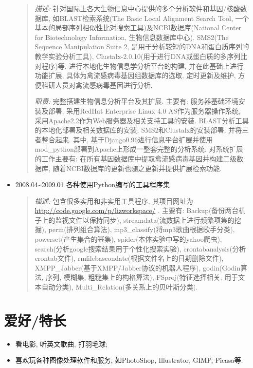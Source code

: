 \documentclass[a4paper,10pt,english]{manual}
\begin{document}
\begin{itemize}
\begin{quote}
\emph{描述:} 针对国际上各大生物信息中心提供的多个分析软件和基因/核酸数据库, 如BLAST检索系统(The Basic Local Alignment Search Tool, 一个基本的局部序列相似性比对搜索工具)及NCBI数据库(National Center for Biotechnology Information, 生物信息数据库中心), SMS2(The Sequence Manipulation Suite 2, 是用于分析较短的DNA和蛋白质序列的教学实验分析工具), Clustalx-2.0.10(用于进行DNA或蛋白质的多序列比对程序)等, 进行本地化生物信息学分析平台的构建, 并在此基础上进行功能扩展, 具体为禽流感病毒基因组数据库的选取, 定时更新及维护, 方便科研人员对禽流感病毒基因进行分析.


\emph{职责:} 完整搭建生物信息分析平台及其扩展. 主要有: 服务器基础环境安装及部署, 采用RedHat Enterprise Linux 4.0 AS作为服务器操作系统, 采用Apache2.2作为Web服务器及相关支持工具的安装. BLAST分析工具的本地化部署及相关数据库的安装, SMS2和Clustalx的安装部署, 并将三者整合起来. 其中, 基于Django0.96进行信息平台扩展并使用mod\_python部署到Apache上形成一整套完整的分析系统. 对系统扩展的工作主要有: 在所有基因数据库中提取禽流感病毒基因并构建二级数据库, 随着NCBI数据库的更新也随之更新并提供扩展检索功能.
\end{quote}

\item {} 
2008.04\textasciitilde{}2009.01 各种使用Python编写的工具程序集
\begin{quote}

\emph{描述:} 包含很多实用和非实用工具程序, 其项目网址为 \href{http://code.google.com/p/lizworkspace/}{http://code.google.com/p/lizworkspace/} . 主要有: Backup(备份两台机子上的监视文件以保持同步), streamdata(流数据上进行频繁项集的挖掘), perm(排列组合算法), mp3\_classify(将mp3歌曲根据歌手分类), powerset(产生集合的幂集), spider(本体实验中写的yahoo爬虫), search(分析google搜索结果用于个性化搜索实验), crontabanalysis(分析crontab文件), rmfilebaseondate(根据文件名上的日期删除文件), XMPP\_Jabber(基于XMPP/Jabber协议的机器人程序), godin(Godin算法, 序列, 模糊集, 粗糙集上的构格算法), FSproj(特征选择相关, 用于文本自动分类), Multi\_Relation(多关系上的贝叶斯分类).
\end{quote}

\end{itemize}


\section{爱好/特长}
\begin{itemize}
\item {} 
看电影, 听英文歌曲, 打羽毛球;

\item {} 
喜欢玩各种图像处理软件和服务, 如PhotoShop, Illustrator, GIMP, Picasa等.

\end{itemize}
\end{document}
